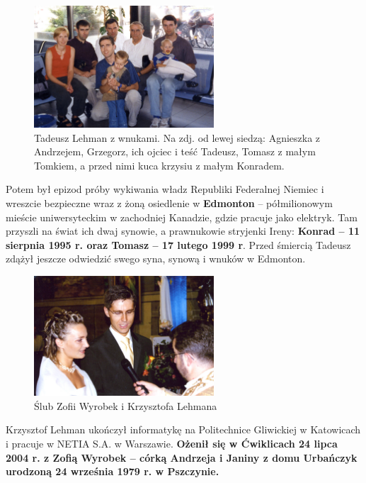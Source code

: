 \begin{figure}[!h]
\begin{center}
\includegraphics[width=0.6\textwidth]{photo/tadeusz_lehman_z_wnukami.jpg}
\caption[Tadeusz Lehman z wnukami]{Tadeusz Lehman z wnukami. Na zdj. od lewej siedzą: Agnieszka z Andrzejem, Grzegorz, ich ojciec i teść Tadeusz, Tomasz z małym Tomkiem, a przed nimi kuca krzysiu z małym Konradem.}
\label{rys:tadeusz_lehman_z_wnukami}
\end{center}
\end{figure}

Potem był epizod próby wykiwania władz Republiki Federalnej Niemiec i wreszcie bezpieczne wraz z żoną osiedlenie w \textbf{Edmonton} -- półmilionowym mieście uniwersyteckim w zachodniej Kanadzie, gdzie pracuje jako elektryk. Tam przyszli na świat ich dwaj synowie, a prawnukowie stryjenki Ireny: \textbf{Konrad -- 11 sierpnia 1995 r. oraz Tomasz -- 17 lutego 1999 r}. Przed śmiercią Tadeusz zdążył jeszcze odwiedzić swego syna, synową i wnuków w Edmonton.

\begin{figure}[!h]
\begin{center}
\includegraphics[width=0.6\textwidth]{photo/krzysztof_zofia_lehman_slub.jpg}
\caption{Ślub Zofii Wyrobek i Krzysztofa Lehmana}
\label{rys:krzysztof_zofia_lehman_slub}
\end{center}
\end{figure}

Krzysztof Lehman ukończył informatykę na Politechnice Gliwickiej w Katowicach i pracuje w NETIA S.A. w Warszawie. \textbf{Ożenił się w Ćwiklicach 24 lipca 2004 r. z Zofią Wyrobek -- córką Andrzeja i Janiny z domu Urbańczyk urodzoną 24 września 1979 r. w Pszczynie.}

